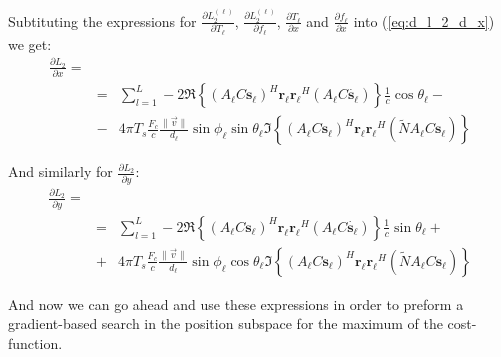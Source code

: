 Subtituting the expressions for $\frac{\partial L_2^{(\ell)}}{\partial T_\ell}$, $\frac{\partial L_2^{(\ell)}}{\partial f_\ell}$, $\frac{\partial T_\ell}{\partial x}$ and $\frac{\partial f_\ell}{\partial x}$ into (\ref{eq:d_l_2_d_x}) we get:
\begin{eqnarray}
\frac{\partial L_2}{\partial x} = \\
&=& \sum_{l=1}^L -2 \Re \left\{ (A_\ell C \mathbf{s_\ell})^H \mathbf{r_\ell} \mathbf{r_\ell}^H (A_\ell C \mathbf{\dot{s_\ell}})\right\}\frac{1}{c}\cos\theta_\ell - \nonumber \\
&-& 4\pi T_s \frac{F_c}{c} \frac{\|\vec{v}\|}{d_\ell} \sin \phi_\ell \sin \theta_\ell \Im \left\{ (A_\ell C  \mathbf{s_\ell})^H \mathbf{r_\ell} \mathbf{r_\ell}^H (\tilde{N} A_\ell C \mathbf{s_\ell})\right\} \nonumber
\end{eqnarray}

And similarly for $\frac{\partial L_2}{\partial y}$:
\begin{eqnarray}
\frac{\partial L_2}{\partial y} = \\
&=& \sum_{l=1}^L -2 \Re \left\{ (A_\ell C \mathbf{s_\ell})^H \mathbf{r_\ell} \mathbf{r_\ell}^H (A_\ell C \mathbf{\dot{s_\ell}})\right\}\frac{1}{c}\sin\theta_\ell + \nonumber \\
&+& 4\pi T_s \frac{F_c}{c} \frac{\|\vec{v}\|}{d_\ell} \sin \phi_\ell \cos \theta_\ell \Im \left\{ (A_\ell C  \mathbf{s_\ell})^H \mathbf{r_\ell} \mathbf{r_\ell}^H (\tilde{N} A_\ell C \mathbf{s_\ell})\right\} \nonumber
\end{eqnarray}

And now we can go ahead and use these expressions in order to preform a gradient-based search in the position subspace for the maximum of the cost-function.